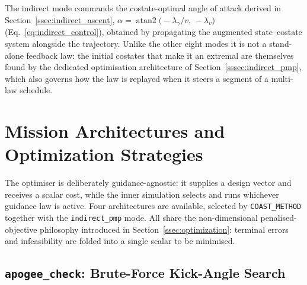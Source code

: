 The indirect mode commands the costate-optimal angle of attack derived in
Section~\ref{ssec:indirect_ascent},
$\alpha=\operatorname{atan2}\!\bigl(-\lambda_\gamma/v,\,-\lambda_v\bigr)$
(Eq.~\eqref{eq:indirect_control}), obtained by propagating the augmented
state--costate system alongside the trajectory. Unlike the other eight modes it is
not a stand-alone feedback law: the initial costates that make it an extremal are
themselves found by the dedicated optimisation architecture of
Section~\ref{sssec:indirect_pmp}, which also governs how the law is replayed when
it steers a segment of a multi-law schedule.

\section{Mission Architectures and Optimization Strategies}
\label{sec:optimization}

The optimiser is deliberately guidance-agnostic: it supplies a design vector and
receives a scalar cost, while the inner simulation selects and runs whichever
guidance law is active. Four architectures are available, selected by
\texttt{COAST\_METHOD} together with the \texttt{indirect\_pmp} mode. All share
the non-dimensional penalised-objective philosophy introduced in
Section~\ref{ssec:optimization}: terminal errors and infeasibility are folded
into a single scalar to be minimised.

\subsection{\texttt{apogee\_check}: Brute-Force Kick-Angle Search}
\label{ssec:apogee_check}

